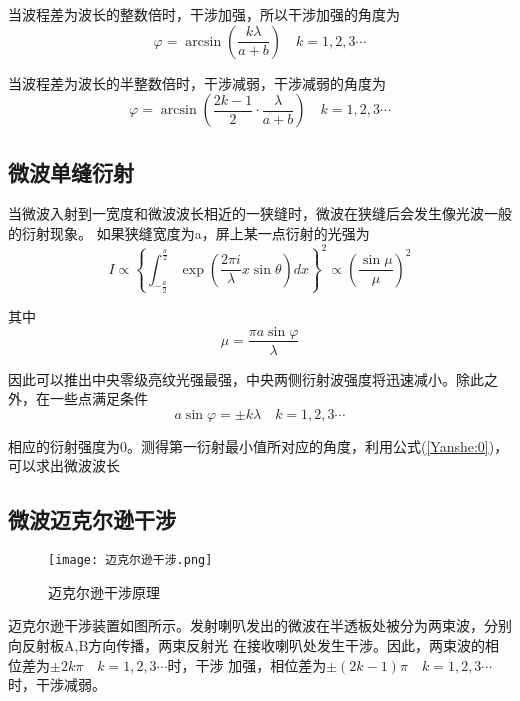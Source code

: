 \documentclass[12pt,a4paper]{article}
\begin{document}
    当波程差为波长的整数倍时，干涉加强，所以干涉加强的角度为
    \begin{equation}
        \varphi  = \arcsin \left( {\frac{{k\lambda }}{{a + b}}} \right)\quad k = 1,2,3 \cdots 
    \end{equation}

    当波程差为波长的半整数倍时，干涉减弱，干涉减弱的角度为
    \begin{equation}
        \varphi  = \arcsin \left( {\frac{{2k - 1}}{2} \cdot \frac{\lambda }{{a + b}}} \right)\quad k = 1,2,3 \cdots 
    \end{equation}

    \subsection{微波单缝衍射}
    当微波入射到一宽度和微波波长相近的一狭缝时，微波在狭缝后会发生像光波一般的衍射现象。
    如果狭缝宽度为a，屏上某一点衍射的光强为
    \begin{equation}
        I \propto {\left\{ {\int_{ - \frac{a}{2}}^{\frac{a}{2}} {\exp \left( {\frac{{2\pi i}}{\lambda }x\sin \theta } \right)dx} } \right\}^2} \propto {\left( {\frac{{\sin \mu }}{\mu }} \right)^2}
    \end{equation}

    其中
    \begin{equation}
        \mu  = \frac{{\pi a\sin \varphi }}{\lambda }
    \end{equation}
    
    因此可以推出中央零级亮纹光强最强，中央两侧衍射波强度将迅速减小。除此之外，在一些点满足条件
    \begin{equation}
        a\sin \varphi  =  \pm k\lambda \quad k = 1,2,3 \cdots 
        \label{Yanshe:0}
    \end{equation}

    相应的衍射强度为0。测得第一衍射最小值所对应的角度，利用公式(\ref{Yanshe:0})，可以求出微波波长

    \subsection{微波迈克尔逊干涉}
    \begin{figure}[H]
        \centering
        \texttt{[image: 迈克尔逊干涉.png]}
        \caption{迈克尔逊干涉原理}
    \end{figure}
    迈克尔逊干涉装置如图所示。发射喇叭发出的微波在半透板处被分为两束波，分别向反射板A,B方向传播，两束反射光
    在接收喇叭处发生干涉。因此，两束波的相位差为$ \pm 2k\pi \quad k = 1,2,3 \cdots $时，干涉
    加强，相位差为$ \pm \left( {2k - 1} \right)\pi \quad k = 1,2,3 \cdots $时，干涉减弱。
    
\end{document}
